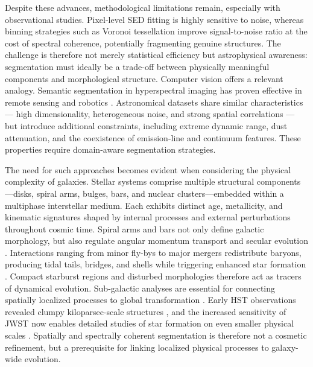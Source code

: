 \documentclass[fleqn,usenatbib]{mnras}
\begin{document}
Despite these advances, methodological limitations remain, especially with observational studies. Pixel-level SED fitting is highly sensitive to noise, whereas binning strategies such as Voronoi tessellation improve signal-to-noise ratio at the  cost of spectral coherence, potentially fragmenting genuine structures. The challenge is therefore not merely statistical efficiency but astrophysical awareness: segmentation must ideally be a trade-off between  physically meaningful components and morphological structure. Computer vision offers a relevant analogy. Semantic segmentation in hyperspectral imaging has proven effective in remote sensing and robotics \citep{Medellin2023}. Astronomical datasets share similar characteristics — high dimensionality, heterogeneous noise, and strong spatial correlations — but introduce additional constraints, including extreme dynamic range, dust attenuation, and the coexistence of emission-line and continuum features. These properties require domain-aware segmentation strategies.


The need for such approaches becomes evident when considering the physical complexity of galaxies. Stellar systems comprise multiple structural components—disks, spiral arms, bulges, bars, and nuclear clusters—embedded within a multiphase interstellar medium.
Each exhibits distinct age, metallicity, and kinematic signatures shaped by internal processes and external perturbations throughout  cosmic time. Spiral arms and bars not only define galactic morphology, but also regulate angular momentum transport and secular evolution \citep[e.g.][]{sellwood2014}. Interactions ranging from minor fly-bys to major mergers redistribute baryons, producing tidal tails, bridges, and shells while triggering enhanced star formation \citep[e.g.][]{luo2014, ferreira2025}.
Compact starburst regions \citep[e.g.][]{calabro2019, elmegreen2021, he2022} and disturbed morphologies therefore act as tracers of dynamical evolution. Sub-galactic analyses are essential for connecting spatially localized processes to global transformation \citep{Helmi2020}. Early HST observations revealed clumpy kiloparsec-scale structures \citep[e.g.][]{cowie1995, elmegreen2005, elmegreen2009}, and the increased sensitivity of JWST now enables detailed studies of star formation on even smaller physical scales \citep[e.g.][]{claeyssens2023, delavega2025}. Spatially and spectrally coherent segmentation is therefore not a cosmetic refinement, but a prerequisite for linking localized physical processes to galaxy-wide evolution.
\end{document}

